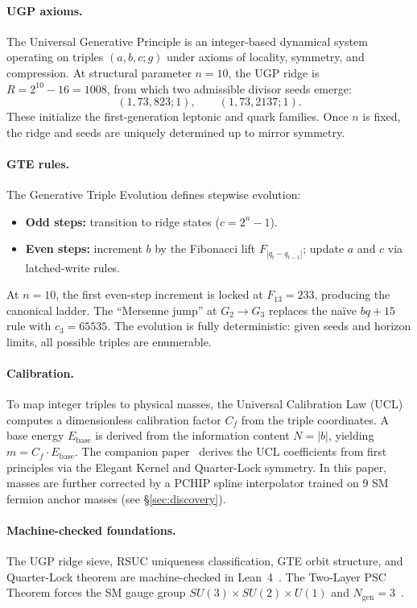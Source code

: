 \documentclass[12pt]{article}
\numberwithin{equation}{section}
\begin{document}
\paragraph{UGP axioms.} The Universal Generative Principle is an integer-based dynamical system operating on triples $(a,b,c;g)$ under axioms of locality, symmetry, and compression. At structural parameter $n{=}10$, the UGP ridge is $R = 2^{10} - 16 = 1008$, from which two admissible divisor seeds emerge:
\[
(1,73,823;1), \qquad (1,73,2137;1).
\]
These initialize the first-generation leptonic and quark families. Once $n$ is fixed, the ridge and seeds are uniquely determined up to mirror symmetry.

\paragraph{GTE rules.} The Generative Triple Evolution defines stepwise evolution:
\begin{itemize}[nosep]
\item \textbf{Odd steps:} transition to ridge states ($c = 2^n - 1$).
\item \textbf{Even steps:} increment $b$ by the Fibonacci lift $F_{|q_t - q_{t-1}|}$; update $a$ and $c$ via latched-write rules.
\end{itemize}
At $n{=}10$, the first even-step increment is locked at $F_{13} = 233$, producing the canonical ladder. The ``Mersenne jump'' at $G_2 \to G_3$ replaces the na\"ive $bq+15$ rule with $c_3 = 65535$. The evolution is fully deterministic: given seeds and horizon limits, all possible triples are enumerable.

\paragraph{Calibration.} To map integer triples to physical masses, the Universal Calibration Law (UCL) computes a dimensionless calibration factor $C_f$ from the triple coordinates. A base energy $E_{\text{base}}$ is derived from the information content $N = |b|$, yielding $m = C_f \cdot E_{\text{base}}$. The companion paper~\cite{SpivackSM} derives the UCL coefficients from first principles via the Elegant Kernel and Quarter-Lock symmetry. In this paper, masses are further corrected by a PCHIP spline interpolator trained on 9 SM fermion anchor masses (see \S\ref{sec:discovery}).

\paragraph{Machine-checked foundations.} The UGP ridge sieve, RSUC uniqueness classification, GTE orbit structure, and Quarter-Lock theorem are machine-checked in Lean~4~\cite{ugp-lean}. The Two-Layer PSC Theorem forces the SM gauge group $SU(3) \times SU(2) \times U(1)$ and $N_{\text{gen}} = 3$~\cite{SpivackNEMS05}.
\end{document}
